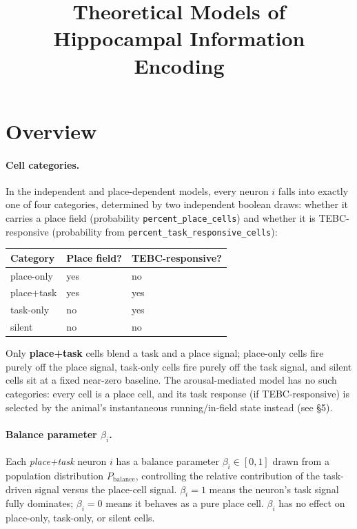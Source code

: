 \documentclass{article}
\title{Theoretical Models of Hippocampal Information Encoding}
\author{}
\date{}
\begin{document}
\maketitle

\section*{Overview}

\paragraph{Cell categories.} In the independent and place-dependent models, every
neuron $i$ falls into exactly one of four categories, determined by two independent
boolean draws: whether it carries a place field
(probability \texttt{percent\_place\_cells}) and whether it is TEBC-responsive
(probability from \texttt{percent\_task\_responsive\_cells}):

\begin{center}
\begin{tabular}{lll}
    \hline
    Category & Place field? & TEBC-responsive? \\
    \hline
    place-only & yes & no \\
    place+task & yes & yes \\
    task-only  & no  & yes \\
    silent     & no  & no \\
    \hline
\end{tabular}
\end{center}

\noindent
Only \textbf{place+task} cells blend a task and a place signal; place-only cells fire
purely off the place signal, task-only cells fire purely off the task signal, and
silent cells sit at a fixed near-zero baseline. The arousal-mediated model has no such
categories: every cell is a place cell, and its task response (if TEBC-responsive) is
selected by the animal's instantaneous running/in-field state instead (see \S5).

\paragraph{Balance parameter $\beta_i$.}
Each \emph{place+task} neuron $i$ has a balance parameter $\beta_i \in [0,1]$ drawn from
a population distribution $P_{\mathrm{balance}}$, controlling the relative contribution
of the task-driven signal versus the place-cell signal. $\beta_i = 1$ means the neuron's
task signal fully dominates; $\beta_i = 0$ means it behaves as a pure place cell.
$\beta_i$ has no effect on place-only, task-only, or silent cells.
\end{document}
